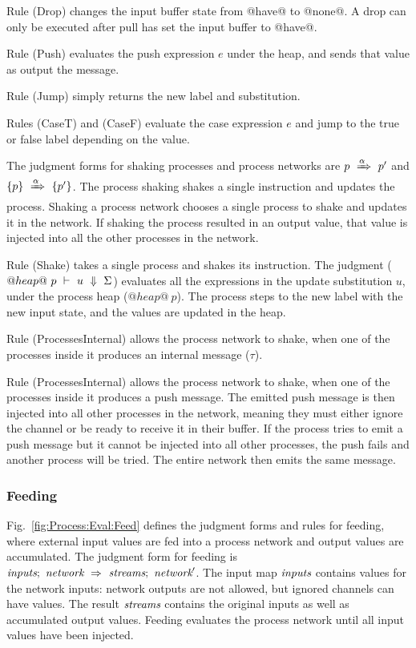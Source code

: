Rule (Drop) changes the input buffer state from @have@ to @none@. A drop can only be executed after pull has set the input buffer to @have@.

Rule (Push) evaluates the push expression $e$ under the heap, and sends that value as output the message.

Rule (Jump) simply returns the new label and substitution.

Rules (CaseT) and (CaseF) evaluate the case expression $e$ and jump to the true or false label depending on the value.

The judgment forms for shaking processes and process networks are $p~\xRightarrow{\alpha}~p'$ and $\{ p \}~\xRightarrow{\alpha}~\{ p' \}$.
The process shaking shakes a single instruction and updates the process.
Shaking a process network chooses a single process to shake and updates it in the network.
If shaking the process resulted in an output value, that value is injected into all the other processes in the network.

Rule (Shake) takes a single process and shakes its instruction.
The judgment ($@heap@~p~\vdash~u~\Downarrow~\Sigma$) evaluates all the expressions in the update substitution $u$, under the process heap ($@heap@~p$).
The process steps to the new label with the new input state, and the values are updated in the heap.

Rule (ProcessesInternal) allows the process network to shake, when one of the processes inside it produces an internal message ($\tau$).

Rule (ProcessesInternal) allows the process network to shake, when one of the processes inside it produces a push message.
The emitted push message is then injected into all other processes in the network, meaning they must either ignore the channel or be ready to receive it in their buffer.
If the process tries to emit a push message but it cannot be injected into all other processes, the push fails and another process will be tried.
The entire network then emits the same message.

\subsubsection{Feeding}
Fig.~\ref{fig:Process:Eval:Feed} defines the judgment forms and rules for feeding, where external input values are fed into a process network and output values are accumulated.
The judgment form for feeding is $\textit{inputs};~\textit{network}~\Rightarrow~\textit{streams};~\textit{network}'$.
The input map $\textit{inputs}$ contains values for the network inputs: network outputs are not allowed, but ignored channels can have values.
The result $\textit{streams}$ contains the original inputs as well as accumulated output values.
Feeding evaluates the process network until all input values have been injected.

